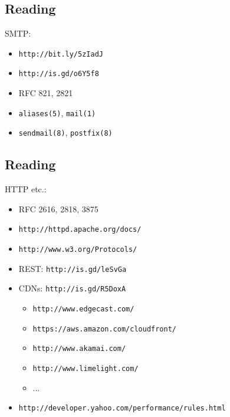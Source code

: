 \documentclass[xga]{xdvislides}
\begin{document}


\subsection{Reading}
SMTP:
\begin{itemize}
	\item \verb+http://bit.ly/5zIadJ+
	\item \verb+http://is.gd/o6Y5f8+
	\item RFC 821, 2821
	\item \verb+aliases(5)+, \verb+mail(1)+
	\item \verb+sendmail(8)+, \verb+postfix(8)+
\end{itemize}

\subsection{Reading}
HTTP etc.:
\begin{itemize}
	\item RFC 2616, 2818, 3875
	\item \verb+http://httpd.apache.org/docs/+
	\item \verb+http://www.w3.org/Protocols/+
	\item REST: \verb+http://is.gd/leSvGa+
	\item CDNs: \verb+http://is.gd/R5DoxA+
		\begin{itemize}
			\item \verb+http://www.edgecast.com/+
			\item \verb+https://aws.amazon.com/cloudfront/+
			\item \verb+http://www.akamai.com/+
			\item \verb+http://www.limelight.com/+
			\item ...
		\end{itemize}
	\item \verb+http://developer.yahoo.com/performance/rules.html+
\end{itemize}
\end{document}
